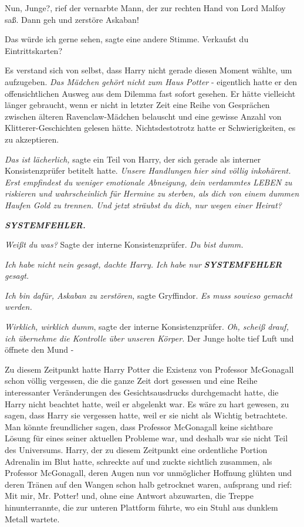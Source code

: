 \glqq{}Nun, Junge?\grqq{}, rief der vernarbte Mann, der zur rechten Hand von Lord
Malfoy saß. \glqq{}Dann geh und zerstöre Askaban!\grqq{}

\glqq{}Das würde ich gerne sehen\grqq{}, sagte eine andere Stimme. \glqq
Verkaufst du Eintrittskarten?\grqq{}

Es verstand sich von selbst, dass Harry nicht gerade diesen Moment wählte, um
aufzugeben. \emph{Das Mädchen gehört nicht zum Haus Potter} - eigentlich hatte
er den offensichtlichen Ausweg aus dem Dilemma fast sofort gesehen. Er hätte
vielleicht länger gebraucht, wenn er nicht in letzter Zeit eine Reihe von
Gesprächen zwischen älteren Ravenclaw-Mädchen belauscht und eine gewisse Anzahl
von Klitterer-Geschichten gelesen hätte. Nichtsdestotrotz hatte er
Schwierigkeiten, es zu akzeptieren.

\emph{Das ist lächerlich,} sagte ein Teil von Harry, der sich gerade als
interner Konsistenzprüfer betitelt hatte. \emph{Unsere Handlungen hier sind
völlig inkohärent. Erst empfindest du weniger emotionale Abneigung, dein
verdammtes LEBEN zu riskieren und wahrscheinlich für Hermine zu sterben, als
dich von einem dummen Haufen Gold zu trennen. Und jetzt sträubst du dich, nur
wegen einer Heirat?}

\textbf{\emph{SYSTEMFEHLER.} }

\emph{Weißt du was?} Sagte der interne Konsistenzprüfer. \emph{Du bist dumm.}

\emph{Ich habe nicht nein gesagt, dachte Harry. Ich habe nur
}\textbf{\emph{SYSTEMFEHLER}}\emph{ gesagt.}

\emph{Ich bin dafür, Askaban zu zerstören,} sagte Gryffindor. \emph{Es muss
sowieso gemacht werden.}

\emph{Wirklich, wirklich dumm}, sagte der interne Konsistenzprüfer. \emph{Oh,
scheiß drauf, ich übernehme die Kontrolle über unseren Körper.} Der Junge holte
tief Luft und öffnete den Mund -

Zu diesem Zeitpunkt hatte Harry Potter die Existenz von Professor McGonagall
schon völlig vergessen, die die ganze Zeit dort gesessen und eine Reihe
interessanter Veränderungen des Gesichtsausdrucks durchgemacht hatte, die Harry
nicht beachtet hatte, weil er abgelenkt war. Es wäre zu hart gewesen, zu sagen,
dass Harry sie vergessen hatte, weil er sie nicht als Wichtig betrachtete. Man
könnte freundlicher sagen, dass Professor McGonagall keine sichtbare Lösung für
eines seiner aktuellen Probleme war, und deshalb war sie nicht Teil des
Universums. Harry, der zu diesem Zeitpunkt eine ordentliche Portion Adrenalin im
Blut hatte, schreckte auf und zuckte sichtlich zusammen, als Professor
McGonagall, deren Augen nun vor unmöglicher Hoffnung glühten und deren Tränen
auf den Wangen schon halb getrocknet waren, aufsprang und rief: \glqq{}Mit mir,
Mr. Potter!\grqq{} und, ohne eine Antwort abzuwarten, die Treppe hinunterrannte,
die zur unteren Plattform führte, wo ein Stuhl aus dunklem Metall wartete.

